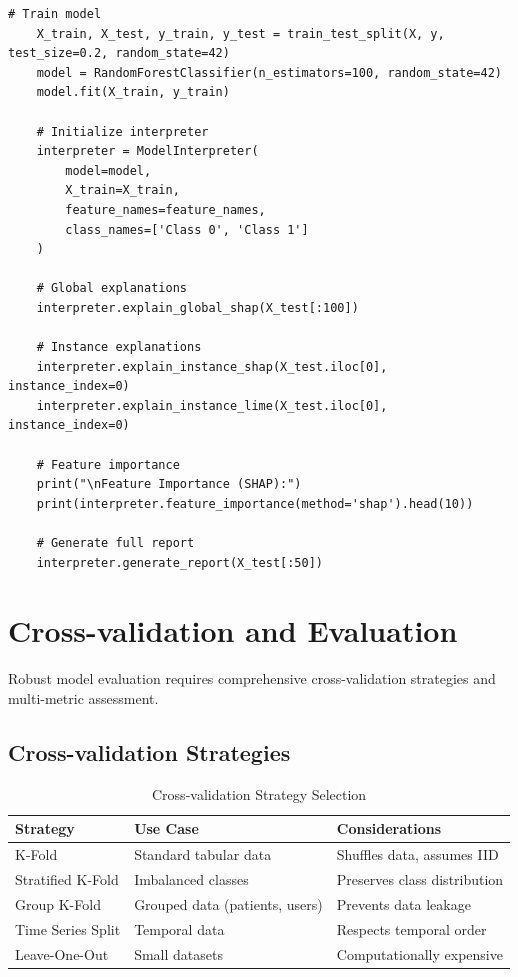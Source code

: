 \begin{lstlisting}[style=python, caption={Model Interpretability Framework with SHAP and LIME}]
    # Train model
    X_train, X_test, y_train, y_test = train_test_split(X, y, test_size=0.2, random_state=42)
    model = RandomForestClassifier(n_estimators=100, random_state=42)
    model.fit(X_train, y_train)

    # Initialize interpreter
    interpreter = ModelInterpreter(
        model=model,
        X_train=X_train,
        feature_names=feature_names,
        class_names=['Class 0', 'Class 1']
    )

    # Global explanations
    interpreter.explain_global_shap(X_test[:100])

    # Instance explanations
    interpreter.explain_instance_shap(X_test.iloc[0], instance_index=0)
    interpreter.explain_instance_lime(X_test.iloc[0], instance_index=0)

    # Feature importance
    print("\nFeature Importance (SHAP):")
    print(interpreter.feature_importance(method='shap').head(10))

    # Generate full report
    interpreter.generate_report(X_test[:50])
\end{lstlisting}

\section{Cross-validation and Evaluation}

Robust model evaluation requires comprehensive cross-validation strategies and multi-metric assessment.

\subsection{Cross-validation Strategies}

\begin{table}[h]
\centering
\caption{Cross-validation Strategy Selection}
\label{tab:cv_strategies}
\begin{tabular}{|l|l|l|}
\hline
\textbf{Strategy} & \textbf{Use Case} & \textbf{Considerations} \\
\hline
K-Fold & Standard tabular data & Shuffles data, assumes IID \\
Stratified K-Fold & Imbalanced classes & Preserves class distribution \\
Group K-Fold & Grouped data (patients, users) & Prevents data leakage \\
Time Series Split & Temporal data & Respects temporal order \\
Leave-One-Out & Small datasets & Computationally expensive \\
\hline
\end{tabular}
\end{table}

